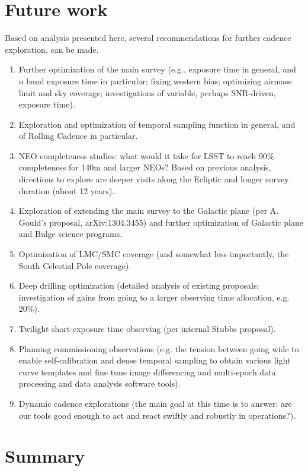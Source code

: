 \newpage
\section{Future work}

Based on analysis presented here, several recommendations
for further cadence exploration, can be made.

\begin{enumerate}
\item Further optimization of the main survey (e.g., exposure time in general, and
 u band exposure time in particular; fixing western bias; optimizing airmass limit
 and sky coverage; investigations of variable, perhaps SNR-driven, exposure time).
\item Exploration and optimization of temporal sampling function in general, and of
      Rolling Cadence in particular.
\item NEO completeness studies: what would it take for LSST to reach
    90\% completeness for 140m and larger NEOs?  Based on previous analysis,
    directions to explore are deeper visits along the Ecliptic and longer survey
    duration (about 12 years).
\item Exploration of extending the main survey to the Galactic plane (per A. Gould's proposal,
     arXiv:1304.3455) and further optimization of Galactic plane and Bulge science programs.
\item Optimization of LMC/SMC coverage (and somewhat less importantly, the South Celestial
         Pole coverage).
\item Deep drilling optimization (detailed analysis of existing proposals; investigation
of gains from going to a larger observing time allocation, e.g. 20\%).
\item Twilight short-exposure time observing (per internal Stubbs proposal).
\item Planning commissioning observations (e.g. the tension between going wide
      to enable self-calibration and dense temporal sampling to obtain various
      light curve templates and fine tune image differencing and multi-epoch data
      processing and data analysis software tools).
\item Dynamic cadence explorations (the main goal at this time is to answer:
        are our tools good enough to act and react swiftly and robustly in operations?).
\end{enumerate}


\newpage
\section{Summary \label{sec:summary}}

